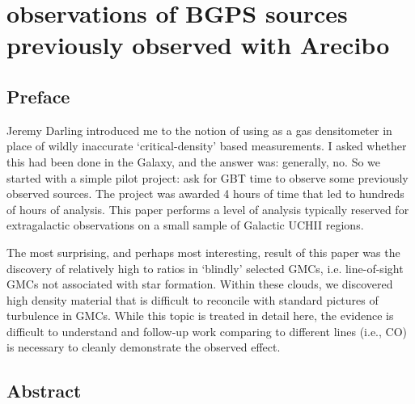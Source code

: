 
%
%

\chapter{\formaldehyde observations of BGPS sources previously observed with Arecibo}
\label{ch:h2co}
\section{Preface}
Jeremy Darling introduced me to the notion of using \formaldehyde as a gas
densitometer in place of wildly inaccurate `critical-density' based
measurements.  I asked whether this had been done in the Galaxy, and the
answer was: generally, no.  So we started with a simple pilot project:
ask for GBT time to observe some previously observed \formaldehyde sources.
The project was awarded 4 hours of time that led to hundreds of hours of analysis.
This paper performs a level of analysis typically reserved for extragalactic
observations on a small sample of Galactic UCHII regions.

The most surprising, and perhaps most interesting, result of this paper was the
discovery of relatively high \formaldehyde \twotwo to \oneone ratios in
`blindly' selected GMCs, i.e.  line-of-sight GMCs not associated with star
formation.  Within these clouds, we discovered high density material that is
difficult to reconcile with standard pictures of turbulence in GMCs.  While
this topic is treated in detail here, the evidence is difficult to understand
and follow-up work comparing to different lines (i.e., CO) is necessary to
cleanly demonstrate the observed effect.

\section{Abstract}

